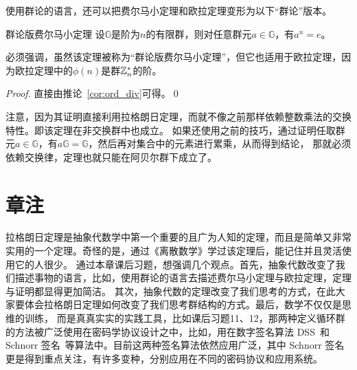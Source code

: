  使用群论的语言，还可以把费尔马小定理和欧拉定理变形为以下“群论”版本。
 \begin{theorem}{群论版费尔马小定理}
  设$\mathbb{G}$是阶为$n$的有限群，则对任意群元$a \in \mathbb{G}$，有$a^n = e$。
 \end{theorem}
必须强调，虽然该定理被称为“群论版费尔马小定理”，但它也适用于欧拉定理，因为欧拉定理中的$\phi(n)$是群${\mathbb Z}_n^*$的阶。

 \begin{proof}
 直接由推论~\ref{cor:ord_div}可得。\qed
 \end{proof}
 注意，因为其证明直接利用拉格朗日定理，而就不像之前那样依赖整数乘法的交换特性。即该定理在非交换群中也成立。
 如果还使用之前的技巧，通过证明任取群元$a\in \mathbb{G}$，有$a\mathbb{G} = \mathbb{G}$，然后再对集合中的元素进行累乘，从而得到结论，
 那就必须依赖交换律，定理也就只能在阿贝尔群下成立了。
 
 \section*{章注}
 拉格朗日定理是抽象代数学中第一个重要的且广为人知的定理，而且是简单又非常实用的一个定理。奇怪的是，通过《离散数学》学过该定理后，能记住并且灵活使用它的人很少。
 通过本章课后习题，想强调几个观点。首先，抽象代数改变了我们描述事物的语言，比如，使用群论的语言去描述费尔马小定理与欧拉定理，定理与证明都显得更加简洁。
 其次，抽象代数的定理改变了我们思考的方式，在此大家要体会拉格朗日定理如何改变了我们思考群结构的方式。最后，数学不仅仅是思维的训练，
 而是真真实实的实践工具，比如课后习题11、12，那两种定义循环群的方法被广泛使用在密码学协议设计之中，比如，用在数字签名算法 DSS~\cite{DSS13}和 Schnorr 签名~\cite{Sch89}等算法中。目前这两种签名算法依然应用广泛，其中 Schnorr 签名更是得到重点关注，有许多变种，分别应用在不同的密码协议和应用系统。
 
